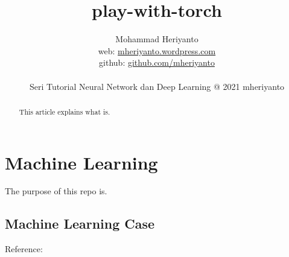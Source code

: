 \documentclass[12pt,oneside,a4paper]{article}
\begin{document}
\title{play-with-torch}
\author{Mohammad Heriyanto \\web: \href{https://mheriyanto.wordpress.com//}{mheriyanto.wordpress.com} \\ github: \href{https://github.com/mheriyanto}{github.com/mheriyanto} \\~\\ Seri Tutorial Neural Network dan Deep Learning @ 2021 mheriyanto}
   
\maketitle

\begin{abstract}
This article explains what is.
\end{abstract}

\section{Machine Learning}
The purpose of this repo is.

\subsection{Machine Learning Case}

Reference: 
\end{document}
